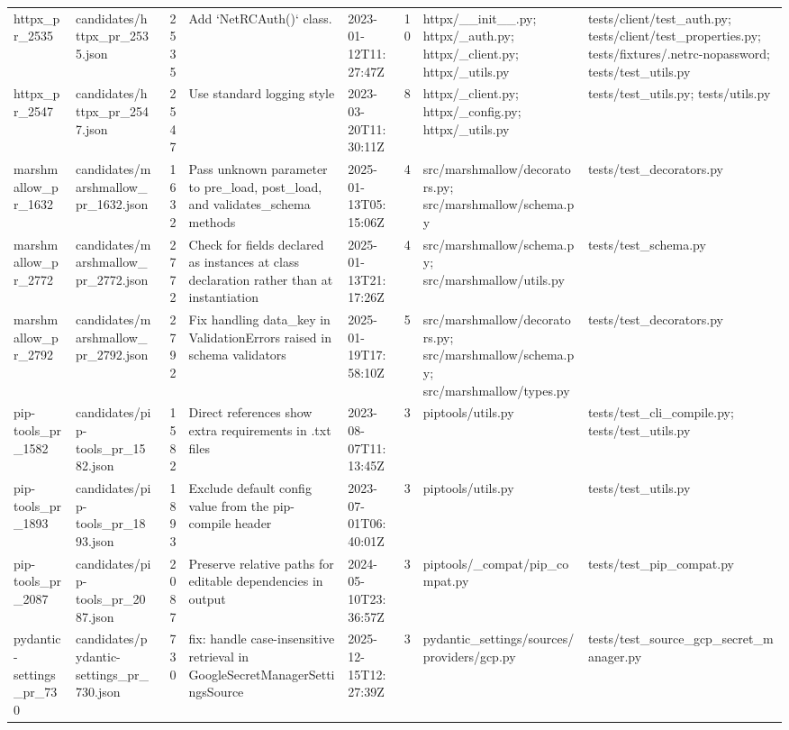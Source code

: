 \begin{tabular}{llrllrll}
httpx\_pr\_2535 & candidates/httpx\_pr\_2535.json & 2535 & Add `NetRCAuth()` class. & 2023-01-12T11:27:47Z & 10 & httpx/\_\_init\_\_.py; httpx/\_auth.py; httpx/\_client.py; httpx/\_utils.py & tests/client/test\_auth.py; tests/client/test\_properties.py; tests/fixtures/.netrc-nopassword; tests/test\_utils.py \\
httpx\_pr\_2547 & candidates/httpx\_pr\_2547.json & 2547 & Use standard logging style & 2023-03-20T11:30:11Z & 8 & httpx/\_client.py; httpx/\_config.py; httpx/\_utils.py & tests/test\_utils.py; tests/utils.py \\
marshmallow\_pr\_1632 & candidates/marshmallow\_pr\_1632.json & 1632 & Pass unknown parameter to pre\_load, post\_load, and validates\_schema methods & 2025-01-13T05:15:06Z & 4 & src/marshmallow/decorators.py; src/marshmallow/schema.py & tests/test\_decorators.py \\
marshmallow\_pr\_2772 & candidates/marshmallow\_pr\_2772.json & 2772 & Check for fields declared as instances at class declaration rather than at instantiation & 2025-01-13T21:17:26Z & 4 & src/marshmallow/schema.py; src/marshmallow/utils.py & tests/test\_schema.py \\
marshmallow\_pr\_2792 & candidates/marshmallow\_pr\_2792.json & 2792 & Fix handling data\_key in ValidationErrors raised in schema validators & 2025-01-19T17:58:10Z & 5 & src/marshmallow/decorators.py; src/marshmallow/schema.py; src/marshmallow/types.py & tests/test\_decorators.py \\
pip-tools\_pr\_1582 & candidates/pip-tools\_pr\_1582.json & 1582 & Direct references show extra requirements in .txt files & 2023-08-07T11:13:45Z & 3 & piptools/utils.py & tests/test\_cli\_compile.py; tests/test\_utils.py \\
pip-tools\_pr\_1893 & candidates/pip-tools\_pr\_1893.json & 1893 & Exclude default config value from the pip-compile header & 2023-07-01T06:40:01Z & 3 & piptools/utils.py & tests/test\_utils.py \\
pip-tools\_pr\_2087 & candidates/pip-tools\_pr\_2087.json & 2087 & Preserve relative paths for editable dependencies in output & 2024-05-10T23:36:57Z & 3 & piptools/\_compat/pip\_compat.py & tests/test\_pip\_compat.py \\
pydantic-settings\_pr\_730 & candidates/pydantic-settings\_pr\_730.json & 730 & fix: handle case-insensitive retrieval in GoogleSecretManagerSettingsSource & 2025-12-15T12:27:39Z & 3 & pydantic\_settings/sources/providers/gcp.py & tests/test\_source\_gcp\_secret\_manager.py \\

\end{tabular}
